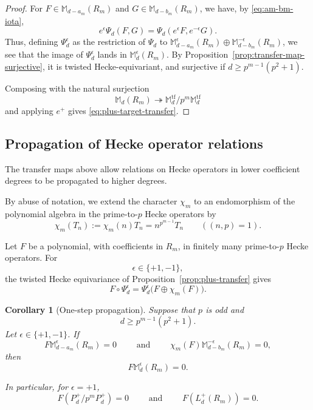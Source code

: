\documentclass[11pt]{article}
\theoremstyle{plain}
\newtheorem{corollary}[theorem]{Corollary}
\theoremstyle{definition}
\theoremstyle{remark}
\numberwithin{equation}{section}
\begin{document}
\begin{proof} For \(F \in \mathbb M_{d-a_m}(R_m)\) and \(G \in \mathbb M_{d-b_m}(R_m)\), we have, by \eqref{eq:am-bm-iota}, \[ e^\epsilon\Psi_d(F,G) = \Psi_d(e^\epsilon F,e^{-\epsilon}G). \] Thus, defining $\Psi^\epsilon_d$ as the restriction of $\Psi_d$ to $\mathbb M^\epsilon_{d-a_m}(R_m) \oplus \mathbb M^{-\epsilon}_{d-b_m}(R_m)$, we see that the image of $\Psi_d^\epsilon$ lands in $\mathbb M^\epsilon_d(R_m)$. By Proposition~\ref{prop:transfer-map-surjective}, it is twisted Hecke-equivariant, and surjective if $d \geq p^{m-1}(p^2 + 1).$

Composing with the natural surjection
\[ \mathbb M_d(R_m) \twoheadrightarrow \mathbb M_d^{\mathrm{tf}}/p^m\mathbb M_d^{\mathrm{tf}} \] and applying $e^+$ gives \eqref{eq:plus-target-transfer}. 
\end{proof}

\subsection{Propagation of Hecke operator relations}

The transfer maps above allow relations on Hecke operators in lower coefficient degrees to be propagated to higher degrees.

By abuse of notation, we extend the character \(\chi_m\) to an endomorphism of the polynomial algebra in the prime-to-\(p\) Hecke operators by \[\chi_m(T_n):=\chi_m(n)T_n=n^{p^{m-1}}T_n \qquad ((n,p)=1). \]

Let \(F\) be a polynomial, with coefficients in \(R_m\), in finitely many prime-to-\(p\) Hecke operators. For \[\epsilon\in\{+1,-1\},\] the twisted Hecke equivariance of Proposition~\ref{prop:plus-transfer} gives \begin{equation} F\circ\Psi_d^\epsilon = \Psi_d^\epsilon \bigl(F\oplus\chi_m(F)\bigr).  \label{eq:two-branch-relation-equivariance} \end{equation}

\begin{corollary}[One-step propagation] \label{cor:one-step-propagation} Suppose that \(p\) is odd and \[ d\geq p^{m-1}(p^2+1). \] Let \(\epsilon\in\{+1,-1\}\). If \[F\mathbb M_{d-a_m}^{\epsilon}(R_m) = 0 \qquad \mbox{ and } \qquad \chi_m(F)\mathbb M_{d-b_m}^{-\epsilon}(R_m)= 0, \] then \[F\mathbb M_d^\epsilon(R_m)=0. \]

In particular, for \(\epsilon=+1\), \[F \left(P_d^+/p^mP_d^+\right)=0 \qquad \mbox { and } \qquad F\left(L_d^+(R_m)\right)=0. \]
\end{corollary}
\end{document}
